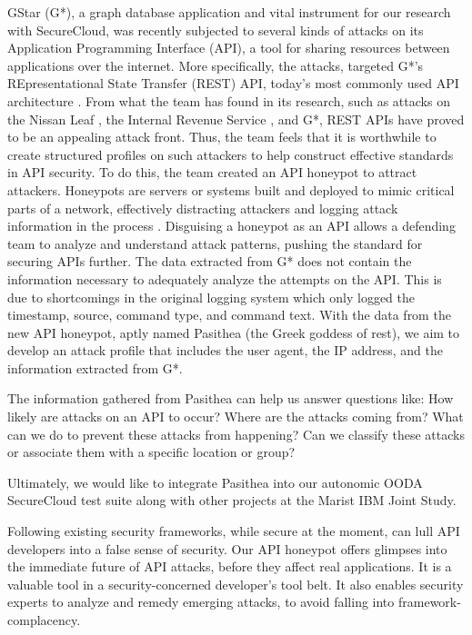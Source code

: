 \documentclass[10pt, conference]{IEEEtran}
\begin{document}
GStar (G*), a graph database application and vital instrument for our research with SecureCloud, was recently subjected to several kinds of attacks on its Application Programming Interface (API), a tool for sharing resources between applications over the internet. More specifically, the attacks, targeted G*’s REpresentational State Transfer (REST) API, today’s most commonly used API architecture \cite{REST-API-use}. From what the team has found in its research, such as attacks on the Nissan Leaf \cite{Nissan-Leaf}, the Internal Revenue Service \cite{IRS}, and G*, REST APIs have proved to be an appealing attack front. Thus, the team feels that it is worthwhile to create structured profiles on such attackers to help construct effective standards in API security.
To do this, the team created an API honeypot to attract attackers. Honeypots are servers or systems built and deployed to mimic critical parts of a network, effectively distracting attackers and logging attack information in the process \cite{honeypot-Def}. Disguising a honeypot as an API allows a defending team to analyze and understand attack patterns, pushing the standard for securing APIs further.
The data extracted from G* does not contain the information necessary to adequately analyze the attempts on the API. This is due to shortcomings in the original logging system which only logged the timestamp, source, command type, and command text. With the data from the new API honeypot, aptly named Pasithea (the Greek goddess of rest), we aim to develop an attack profile that includes the user agent, the IP address, and the information extracted from G*.

The information gathered from Pasithea can help us answer questions like: How likely are attacks on an API to occur? Where are the attacks coming from? What can we do to prevent these attacks from happening? Can we classify these attacks or associate them with a specific location or group?

Ultimately, we would like to integrate Pasithea into our autonomic OODA SecureCloud test suite along with other projects at the Marist IBM Joint Study.

Following existing security frameworks, while secure at the moment, can lull API developers into a false sense of security. Our API honeypot offers glimpses into the immediate future of API attacks, before they affect real applications. It is a valuable tool in a security-concerned developer's tool belt. It also enables security experts to analyze and remedy emerging attacks, to avoid falling into framework-complacency.
\end{document}
